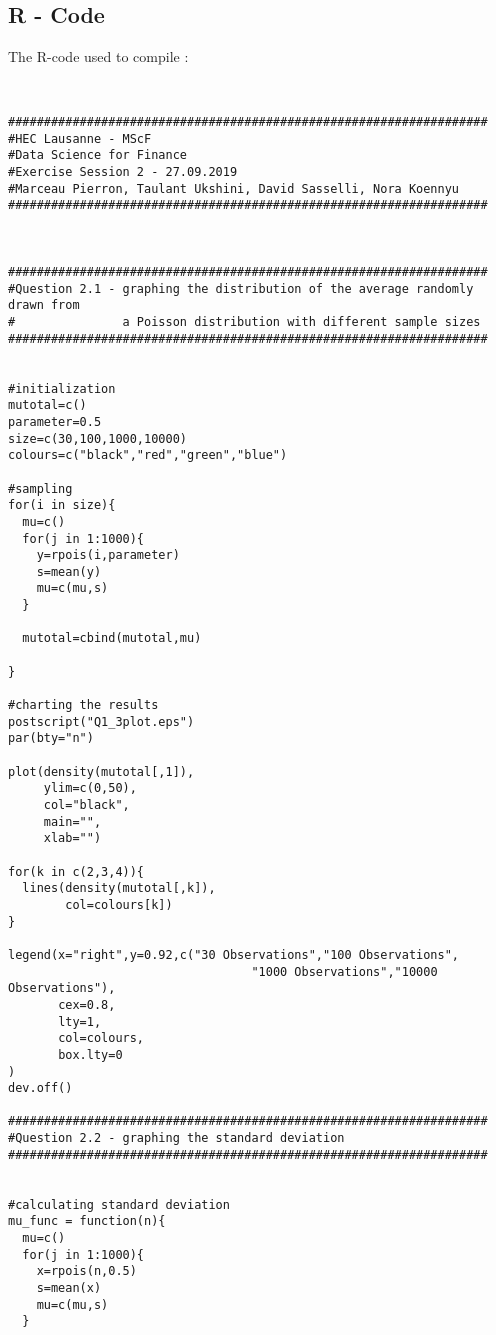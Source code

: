 \begin{appendices}

\chapter{R - Code}

The R-code used to compile :

\begin{verbatim}


###################################################################
#HEC Lausanne - MScF
#Data Science for Finance
#Exercise Session 2 - 27.09.2019
#Marceau Pierron, Taulant Ukshini, David Sasselli, Nora Koennyu
###################################################################



###################################################################
#Question 2.1 - graphing the distribution of the average randomly drawn from
#               a Poisson distribution with different sample sizes
###################################################################


#initialization
mutotal=c()
parameter=0.5
size=c(30,100,1000,10000)
colours=c("black","red","green","blue")

#sampling
for(i in size){
  mu=c()
  for(j in 1:1000){
    y=rpois(i,parameter)
    s=mean(y)
    mu=c(mu,s)
  }
  
  mutotal=cbind(mutotal,mu)
  
}

#charting the results
postscript("Q1_3plot.eps")
par(bty="n")

plot(density(mutotal[,1]),
     ylim=c(0,50),
     col="black",
     main="",
     xlab="")

for(k in c(2,3,4)){
  lines(density(mutotal[,k]),
        col=colours[k])
}

legend(x="right",y=0.92,c("30 Observations","100 Observations",
                                  "1000 Observations","10000 Observations"),
       cex=0.8,
       lty=1,
       col=colours,
       box.lty=0
)
dev.off()

###################################################################
#Question 2.2 - graphing the standard deviation
###################################################################


#calculating standard deviation
mu_func = function(n){
  mu=c()
  for(j in 1:1000){
    x=rpois(n,0.5)
    s=mean(x)
    mu=c(mu,s)
  }
  

\end{verbatim}
\end{appendices}
